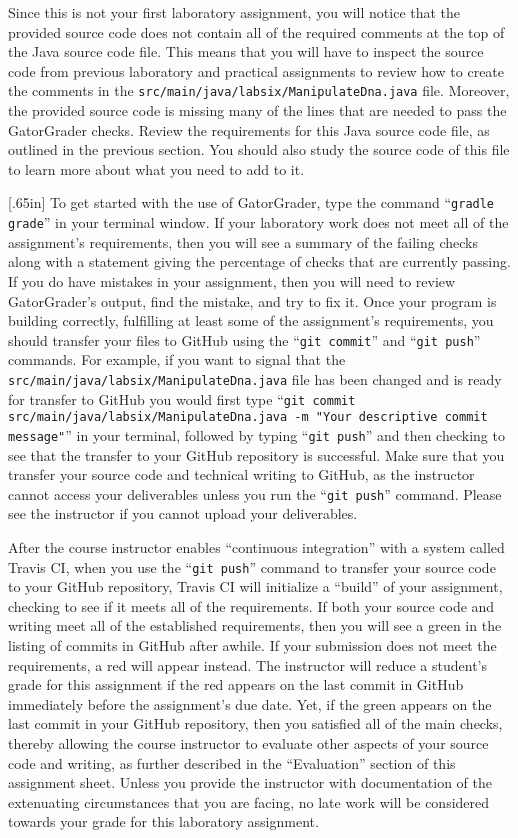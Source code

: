 \documentclass[11pt]{article}
\newcommand{\mainprogramsource}{\lstinline{src/main/java/labsix/ManipulateDna.java}}
\newcommand{\gatorgraderstart}{\command{gradle grade}}
\newcommand{\gitcommit}{\command{git commit}}
\newcommand{\gitpush}{\command{git push}}
\newcommand{\gitcommitmainprogram}{\command{git commit src/main/java/labsix/ManipulateDna.java -m "Your
descriptive commit message"}}
\newcommand{\command}[1]{``\lstinline{#1}''}
\newcommand{\step}[1]{``{#1}''}
\newcommand{\caution}[1]{\null\hfill\LARGE{\faWarning{}}\newline\scriptsize{\em{#1}}}
\newcommand{\checkmark}{\ding{51}}
\newcommand{\naughtmark}{\ding{55}}
\begin{document}
Since this is not your first laboratory assignment, you will notice that the
provided source code does not contain all of the required comments at the top of
the Java source code file. This means that you will have to inspect the source
code from previous laboratory and practical assignments to review how to create
the comments in the \mainprogramsource{} file. Moreover, the provided source
code is missing many of the lines that are needed to pass the GatorGrader
checks. Review the requirements for this Java source code file, as outlined in
the previous section. You should also study the source code of this file to
learn more about what you need to add to it.

\marginnote{\caution{Transfer to GitHub}}[.65in] To get started with the use of
GatorGrader, type the command \gatorgraderstart{} in your terminal window. If
your laboratory work does not meet all of the assignment's requirements, then
you will see a summary of the failing checks along with a statement giving the
percentage of checks that are currently passing. If you do have mistakes in your
assignment, then you will need to review GatorGrader's output, find the mistake,
and try to fix it. Once your program is building correctly, fulfilling at least
some of the assignment's requirements, you should transfer your files to GitHub
using the \gitcommit{} and \gitpush{} commands. For example, if you want to
signal that the \mainprogramsource{} file has been changed and is ready for
transfer to GitHub you would first type \gitcommitmainprogram{} in your
terminal, followed by typing \gitpush{} and then checking to see that the
transfer to your GitHub repository is successful. Make sure that you transfer
your source code and technical writing to GitHub, as the instructor cannot
access your deliverables unless you run the \gitpush{} command. Please see the
instructor if you cannot upload your deliverables.

After the course instructor enables \step{continuous integration} with a system
called Travis CI, when you use the \gitpush{} command to transfer your source
code to your GitHub repository, Travis CI will initialize a \step{build} of your
assignment, checking to see if it meets all of the requirements. If both your
source code and writing meet all of the established requirements, then you will
see a green \checkmark{} in the listing of commits in GitHub after awhile. If
your submission does not meet the requirements, a red \naughtmark{} will appear
instead. The instructor will reduce a student's grade for this assignment if the
red \naughtmark{} appears on the last commit in GitHub immediately before the
assignment's due date. Yet, if the green \checkmark{} appears on the last commit
in your GitHub repository, then you satisfied all of the main checks, thereby
allowing the course instructor to evaluate other aspects of your source code and
writing, as further described in the \step{Evaluation} section of this
assignment sheet. Unless you provide the instructor with documentation of the
extenuating circumstances that you are facing, no late work will be considered
towards your grade for this laboratory assignment.
\end{document}
